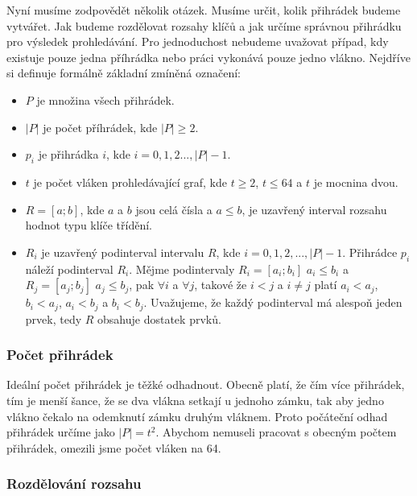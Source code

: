 Nyní musíme zodpovědět několik otázek.
Musíme určit, kolik přihrádek budeme vytvářet.
Jak budeme rozdělovat rozsahy klíčů a jak určíme správnou přihrádku pro výsledek prohledávání.
Pro jednoduchost nebudeme uvažovat případ, kdy existuje pouze jedna příhrádka nebo práci vykonává pouze jedno vlákno.
Nejdříve si definuje formálně základní zmíněná označení:

\begin{itemize}

\item $P$ je množina všech přihrádek.

\item $|P|$ je počet příhrádek, kde $|P|\geq2$.

\item $p_i$ je přihrádka $i$, kde $i=0, 1, 2 ..., |P|-1$.

\item $t$ je počet vláken prohledávající graf, kde $t\geq2$, $t\leq64$ a $t$ je mocnina dvou.

\item $R=[a; b]$, kde $a$ a $b$ jsou celá čísla a $a\leq b$, je uzavřený interval rozsahu hodnot typu klíče třídění.

\item $R_i$ je uzavřený podinterval intervalu $R$, kde $i=0, 1, 2, ..., |P|-1$.
Přihrádce $p_i$ náleží podinterval $R_i$.
Mějme podintervaly $R_i=[a_i; b_i]$ $a_i\leq b_i$ a $R_j=[a_j; b_j]$ $a_j\leq b_j$, pak $\forall i$ a $\forall j$, takové že $i<j$ a $i\neq j$ platí $a_i<a_j$, $b_i<a_j$, $a_i<b_j$ a $b_i<b_j$.
Uvažujeme, že každý podinterval má alespoň jeden prvek, tedy $R$ obsahuje dostatek prvků.

\end{itemize}

\subsubsection{Počet přihrádek}

Ideální počet přihrádek je těžké odhadnout.
Obecně platí, že čím více přihrádek, tím je menší šance, že se dva vlákna setkají u jednoho zámku, tak aby jedno vlákno čekalo na odemknutí zámku druhým vláknem.
Proto počáteční odhad přihrádek určíme jako $|P|=t^2$.
Abychom nemuseli pracovat s obecným počtem přihrádek, omezili jsme počet vláken na 64.

\subsubsection{Rozdělování rozsahu}

